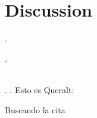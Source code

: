 \documentclass[../Dissertation]{subfiles}
\begin{document}
\section{Discussion}\label{discussion_4}
    \lipsum[64-66] \cite{Foos_1972_PVD,
    Balazs_1982, Sebag_1987, Sebag_1989, Uchino_2001} 
    
    \lipsum[64] \cite{Kakehashi_1997, Kakehashi_2014}.  
    
    \lipsum[64] \cite{Akiba_1993}.
    
    \lipsum[64-69] \\
    \cite{Kohno_1987, Gandorfer_2001, Gandorfer_2002}.
    \cite{Kohno_1987}
    \cite{Gandorfer_2002}.
    Esto es Queralt: \citep{Queralt_1989}
    
    Buscando la cita

    \lipsum[64-69]
\end{document}

